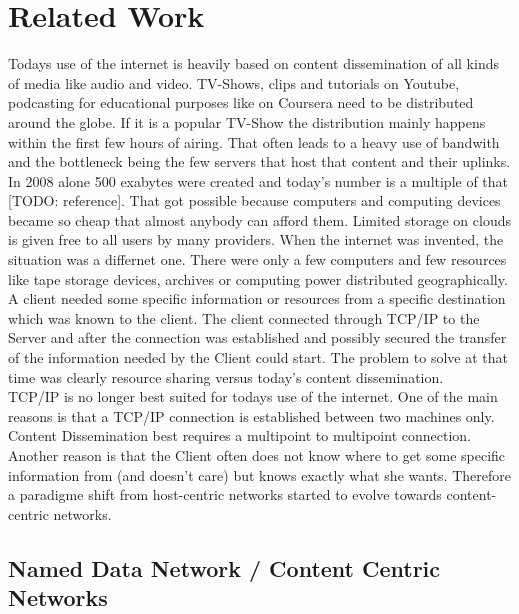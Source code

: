 \chapter{Related Work}

Todays use of the internet is heavily based on content dissemination of all kinds of media like audio and video. TV-Shows, clips and tutorials on Youtube, podcasting for educational purposes like on Coursera need to be distributed around the globe. If it is a popular TV-Show the distribution mainly happens within the first few hours of airing. That often leads to a heavy use of bandwith and the bottleneck being the few servers that host that content and their uplinks. In 2008 alone 500 exabytes were created and today's number is a multiple of that [TODO: reference]. That got possible because computers and computing devices became so cheap that almost anybody can afford them. Limited storage on clouds is given free to all users by many providers. When the internet was invented, the situation was a differnet one. There were only a few computers and few resources like tape storage devices, archives or computing power distributed geographically. A client needed some specific information or resources from a specific destination which was known to the client. The client connected through TCP/IP to the Server and after the connection was established and possibly secured the transfer of the information needed by the Client could start. The problem to solve at that time was clearly resource sharing versus today's content dissemination.\\

TCP/IP is no longer best suited for todays use of the internet. One of the main reasons is that a TCP/IP connection is established between two machines only. Content Dissemination best requires a multipoint to multipoint connection. Another reason is that the Client often does not know where to get some specific information from (and doesn't care) but knows exactly what she wants. Therefore a paradigme shift from host-centric networks started to evolve towards content-centric networks.

\section{Named Data Network / Content Centric Networks}

